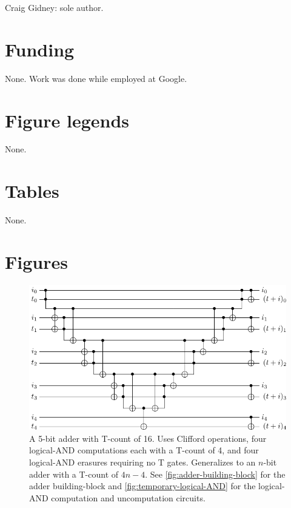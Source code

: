\documentclass[twocolumn]{revtex4-1}
\begin{document}
Craig Gidney: sole author.

\section*{Funding}

None. Work was done while employed at Google.




\section*{Figure legends}

None.

\section*{Tables}

None.

\section*{Figures}


\begin{figure}[H]
  \includegraphics[width=\linewidth]{adder.pdf}
  \caption{
	A 5-bit adder with T-count of 16.
	Uses Clifford operations, four logical-AND computations each with a T-count of 4, and four logical-AND erasures requiring no T gates.
	Generalizes to an $n$-bit adder with a T-count of $4n - 4$.
	See \autoref{fig:adder-building-block} for the adder building-block and \autoref{fig:temporary-logical-AND} for the logical-AND computation and uncomputation circuits.
  }
  \label{fig:adder}
\end{figure}
\end{document}

